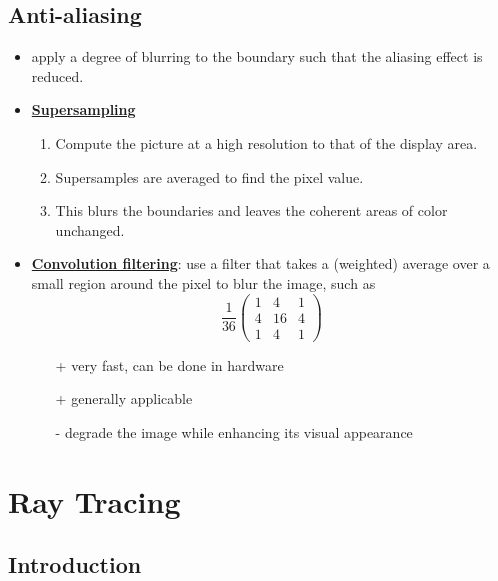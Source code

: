 \documentclass[twocolumn,landscape,10pt]{article}
\theoremstyle{definition}
\begin{document}
\subsection{Anti-aliasing}

\begin{itemize}
    \item apply a degree of blurring to the boundary such that the
        aliasing effect is reduced.
    \item \underline{\textbf{Supersampling}}
        \begin{enumerate}
            \item Compute the picture at a high resolution to that of the
                display area.
            \item Supersamples are averaged to find the pixel value.
            \item This blurs the boundaries and leaves the coherent areas of
                color unchanged.
        \end{enumerate} 
    \item \underline{\textbf{Convolution filtering}}: use a filter that takes a
        (weighted) average over a small region around the pixel to blur the
        image, such as
        \[
            \frac{1}{36}
            \begin{pmatrix}
                1 & 4 & 1 \\
                4 & 16 & 4 \\
                1 & 4 & 1
            \end{pmatrix} 
        \]
        \begin{itemize}
            \item[+] very fast, can be done in hardware
            \item[+] generally applicable
            \item[-] degrade the image while enhancing its visual appearance
        \end{itemize} 
\end{itemize} 


\section{Ray Tracing}

\subsection{Introduction}
\end{document}

